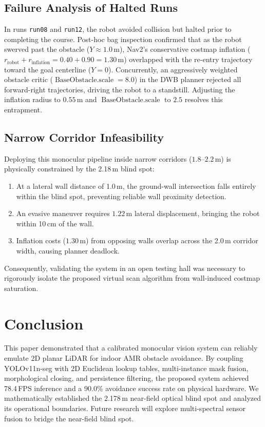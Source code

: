 \documentclass[12pt]{iopart}
\begin{document}
\subsection{Failure Analysis of Halted Runs}
In runs \texttt{run08} and \texttt{run12}, the robot avoided collision but halted prior to completing the course. Post-hoc bag inspection confirmed that as the robot swerved past the obstacle ($Y \approx 1.0$\,m), Nav2's conservative costmap inflation ($r_{\mathrm{robot}} + r_{\mathrm{inflation}} = 0.40 + 0.90 = 1.30$\,m) overlapped with the re-entry trajectory toward the goal centerline ($Y=0$). Concurrently, an aggressively weighted obstacle critic ($\operatorname{BaseObstacle.scale} = 8.0$) in the DWB planner rejected all forward-right trajectories, driving the robot to a standstill. Adjusting the inflation radius to $0.55$\,m and $\operatorname{BaseObstacle.scale}$ to $2.5$ resolves this entrapment.

\subsection{Narrow Corridor Infeasibility}
Deploying this monocular pipeline inside narrow corridors ($1.8\text{--}2.2$\,m) is physically constrained by the 2.18\,m blind spot:
\begin{enumerate}
  \item At a lateral wall distance of 1.0\,m, the ground-wall intersection falls entirely within the blind spot, preventing reliable wall proximity detection.
  \item An evasive maneuver requires $1.22$\,m lateral displacement, bringing the robot within 10\,cm of the wall.
  \item Inflation costs ($1.30$\,m) from opposing walls overlap across the 2.0\,m corridor width, causing planner deadlock.
\end{enumerate}
Consequently, validating the system in an open testing hall was necessary to rigorously isolate the proposed virtual scan algorithm from wall-induced costmap saturation.

\section{Conclusion}
\label{sec:conclusion}

This paper demonstrated that a calibrated monocular vision system can reliably emulate 2D planar LiDAR for indoor AMR obstacle avoidance. By coupling YOLOv11n-seg with 2D Euclidean lookup tables, multi-instance mask fusion, morphological closing, and persistence filtering, the proposed system achieved 78.4\,FPS inference and a 90.0\% avoidance success rate on physical hardware. We mathematically established the 2.178\,m near-field optical blind spot and analyzed its operational boundaries. Future research will explore multi-spectral sensor fusion to bridge the near-field blind spot.
\end{document}

